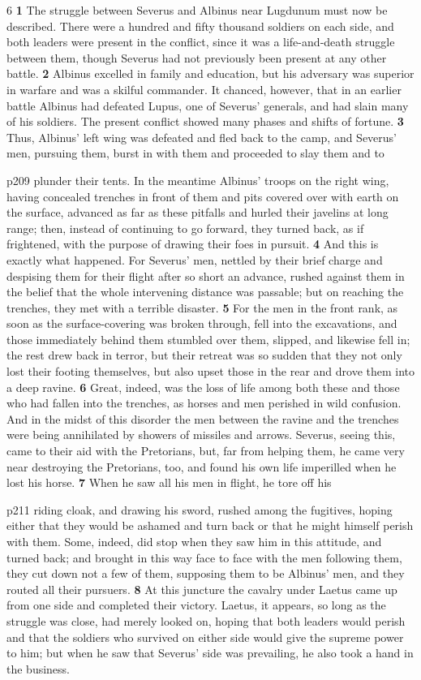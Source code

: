 6 \textbf{1} The struggle between Severus and Albinus near Lugdunum must now be described. There were a hundred and fifty thousand soldiers on each side, and both leaders were present in the conflict, since it was a life-and\texthebrew{‑}death struggle between them, though Severus had not previously been present at any other battle. \textbf{2} Albinus excelled in family and education, but his adversary was superior in warfare and was a skilful commander. It chanced, however, that in an earlier battle Albinus had defeated Lupus, one of Severus' generals, and had slain many of his soldiers. The present conflict showed many phases and shifts of fortune. \textbf{3} Thus, Albinus' left wing was defeated and fled back to the camp, and Severus' men, pursuing them, burst in with them and proceeded to slay them and to

p209 plunder their tents. In the meantime Albinus' troops on the right wing, having concealed trenches in front of them and pits covered over with earth on the surface, advanced as far as these pitfalls and hurled their javelins at long range; then, instead of continuing to go forward, they turned back, as if frightened, with the purpose of drawing their foes in pursuit. \textbf{4} And this is exactly what happened. For Severus' men, nettled by their brief charge and despising them for their flight after so short an advance, rushed against them in the belief that the whole intervening distance was passable; but on reaching the trenches, they met with a terrible disaster. \textbf{5} For the men in the front rank, as soon as the surface-covering was broken through, fell into the excavations, and those immediately behind them stumbled over them, slipped, and likewise fell in; the rest drew back in terror, but their retreat was so sudden that they not only lost their footing themselves, but also upset those in the rear and drove them into a deep ravine. \textbf{6} Great, indeed, was the loss of life among both these and those who had fallen into the trenches, as horses and men perished in wild confusion. And in the midst of this disorder the men between the ravine and the trenches were being annihilated by showers of missiles and arrows. Severus, seeing this, came to their aid with the Pretorians, but, far from helping them, he came very near destroying the Pretorians, too, and found his own life imperilled when he lost his horse. \textbf{7} When he saw all his men in flight, he tore off his

p211 riding cloak, and drawing his sword, rushed among the fugitives, hoping either that they would be ashamed and turn back or that he might himself perish with them. Some, indeed, did stop when they saw him in this attitude, and turned back; and brought in this way face to face with the men following them, they cut down not a few of them, supposing them to be Albinus' men, and they routed all their pursuers. \textbf{8} At this juncture the cavalry under Laetus came up from one side and completed their victory. Laetus, it appears, so long as the struggle was close, had merely looked on, hoping that both leaders would perish and that the soldiers who survived on either side would give the supreme power to him; but when he saw that Severus' side was prevailing, he also took a hand in the business.

